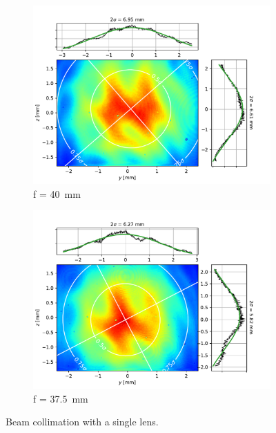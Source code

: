 \begin{figure}[p]
    \begin{subfigure}{0.5\textwidth}
        \centering
        \includegraphics[width=\textwidth]{chapters/chapter_3/figures/beam_f40.pdf}
        \caption{f = \SI{40}{mm}}
        \label{fig:beam_f40}
    \end{subfigure}
    \begin{subfigure}{0.5\textwidth}
        \centering
        \includegraphics[width=\textwidth]{chapters/chapter_3/figures/beam_f37.pdf}
        \caption{f = \SI{37.5}{mm}}
        \label{fig:beam_f37.5}
    \end{subfigure}
    \caption{Beam collimation with a single lens.}
    \label{fig:beam_single_lens}
\end{figure}

